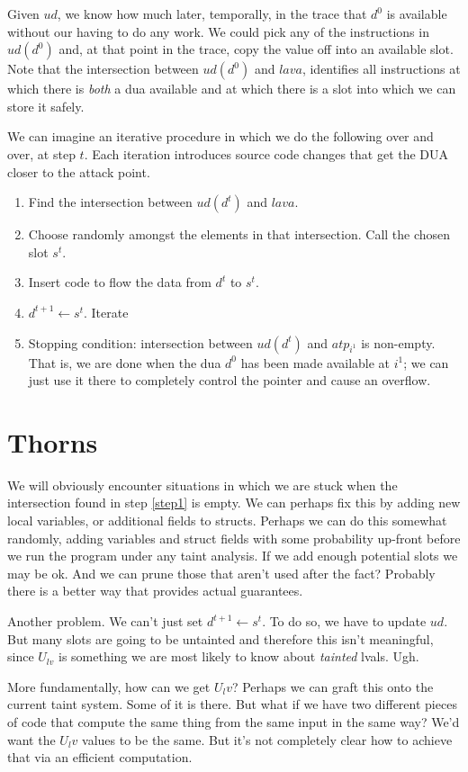 \documentclass{article}
\begin{document}
Given $ud$, we know how much later, temporally, in the trace that $d^0$ is available without our having to do any work.  We could pick any of the instructions in $ud(d^0)$ and, at that point in the trace, copy the value off into an available slot.  
 Note that the intersection between $ud(d^0)$ and $lava$, identifies all instructions at which there is \emph{both} a dua available and at which there is a slot into which we can store it safely. 

We can imagine an iterative procedure in which we do the following over and over, at step $t$. Each iteration introduces source code changes that get the DUA closer to the attack point.  

\begin{enumerate}
\item \label{step1} Find the intersection between $ud(d^{t})$ and $lava$.
\item Choose randomly amongst the elements in that intersection.  Call the chosen slot $s^t$.
\item Insert code to flow the data from $d^{t}$ to $s^t$. 
\item $d^{t+1} \leftarrow s^t$.  Iterate 
\item Stopping condition:  intersection between $ud(d^t)$ and $atp_{i^1}$ is non-empty.  That is, we are done when the dua $d^0$ has been made available at $i^1$; we can just use it there to completely control the pointer and cause an overflow. 
\end{enumerate}

\section{Thorns}


We will obviously encounter situations in which we are stuck when the intersection found in step \ref{step1} is empty.  
We can perhaps fix this by adding new local variables, or additional fields to structs.  Perhaps we can do this somewhat randomly, adding variables and struct fields with some probability up-front before we run the program under any taint analysis.  If we add enough potential slots we may be ok.  And we can prune those that aren't used after the fact?  Probably there is a better way that provides actual guarantees.  

Another problem.  We can't just set $d^{t+1} \leftarrow s^t$.  To do so, we have to update $ud$.  But many slots are going to be untainted and therefore this isn't meaningful, since $U_{lv}$ is something we are most likely to know about \emph{tainted} lvals.  Ugh.  

More fundamentally, how can we get $U_lv$?  Perhaps we can graft this onto the current taint system.  Some of it is there.  But what if we have two different pieces of code that compute the same thing from the same input in the same way?  We'd want the $U_lv$ values to be the same.  But it's not completely clear how to achieve that via an efficient computation. 
\end{document}
